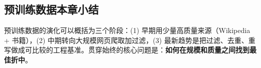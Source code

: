 \subsection{预训练数据本章小结}

预训练数据的演化可以概括为三个阶段：(1) 早期用少量高质量来源（Wikipedia + 书籍），(2) 中期转向大规模网页爬取加过滤，(3) 最新趋势是把过滤、去重、重写做成可比较的工程基准。贯穿始终的核心问题是：\textbf{如何在规模和质量之间找到最佳折中}。


